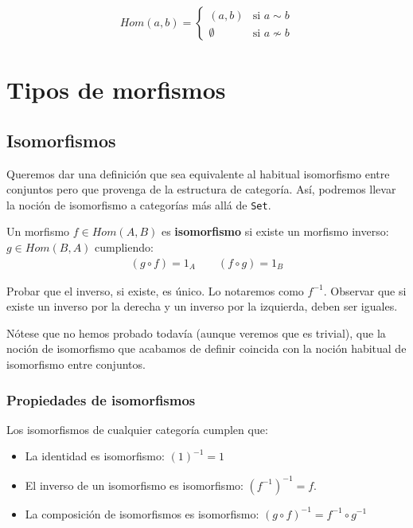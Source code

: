\documentclass[11pt, fleqn, spanish]{book}
\newcommand{\twopartdef}[4]
{
  \left\{
    \begin{array}{ll}
      #1 & \mbox{si } #2 \\
      #3 & \mbox{si } #4
    \end{array}
  \right.
}
\begin{document}
\begin{align*}
  Hom(a,b)= \twopartdef{(a,b)}{a \sim b}{\emptyset}{a \nsim b}
\end{align*}





\chapter{Tipos de morfismos}

\section {Isomorfismos}
Queremos dar una definición que sea equivalente al habitual
isomorfismo entre conjuntos pero que provenga de la estructura de
categoría. Así, podremos llevar la noción de isomorfismo a categorías
más allá de \texttt{Set}.

\begin{definition}
  Un morfismo $f \in Hom(A,B)$ es \textbf{isomorfismo} si existe un morfismo inverso:
  $g \in Hom(B,A)$ cumpliendo:
  \begin{gather*}
    (g \circ f) = 1_A \qquad (f \circ g) = 1_B
  \end{gather*}
\end{definition}
  
\begin{exercise} 
  Probar que el inverso, si existe, es único. Lo notaremos como $f^{-1}$. Observar que si
  existe un inverso por la derecha y un inverso por la izquierda, deben ser iguales.
\end{exercise}

Nótese que no hemos probado todavía (aunque veremos que es trivial),
que la noción de isomorfismo que acabamos de definir coincida con la
noción habitual de isomorfismo entre conjuntos.


\subsection{Propiedades de isomorfismos}
\begin{theorem}
  Los isomorfismos de cualquier categoría cumplen que:
  
  \begin{itemize}
  \item La identidad es isomorfismo: $(1)^{-1} = 1$ 
  \item El inverso de un isomorfismo es isomorfismo: $(f^{-1})^{-1} = f$.
  \item La composición de isomorfismos es isomorfismo: $(g \circ f)^{-1} = f^{-1} \circ g^{-1}$
  \end{itemize}

\end{theorem}
\end{document}
